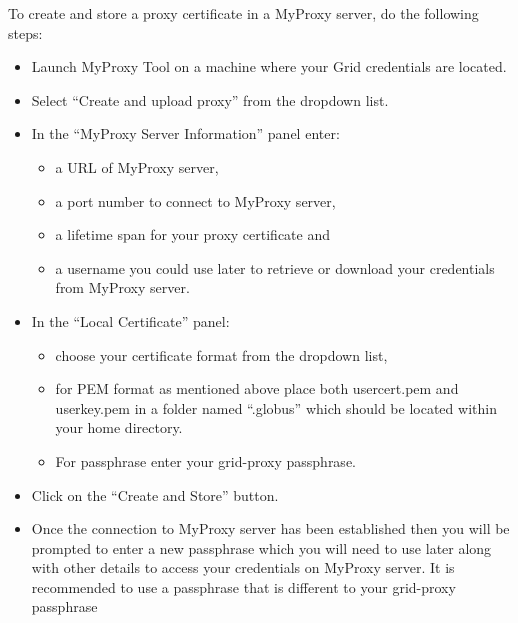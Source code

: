 \documentclass[english]{book}
\begin{document}
To create and store a proxy certificate in a MyProxy server, do the
following steps:
\begin{itemize}
\item {} 
Launch MyProxy Tool on a machine where your Grid credentials are
located.

\item {} 
Select “Create and upload proxy” from the dropdown list.

\item {} 
In the “MyProxy Server Information” panel enter:
\begin{itemize}
\item {} 
a URL of MyProxy server,

\item {} 
a port number to connect to MyProxy server,

\item {} 
a lifetime span for your proxy certificate and

\item {} 
a username you could use later to retrieve or download your
credentials from MyProxy server.

\end{itemize}

\item {} 
In the “Local Certificate” panel:
\begin{itemize}
\item {} 
choose your certificate format from the dropdown list,

\item {} 
for PEM format as mentioned above place both usercert.pem and
userkey.pem in a folder named “.globus” which should be located
within your home directory.

\item {} 
For passphrase enter your grid-proxy passphrase.

\end{itemize}

\item {} 
Click on the “Create and Store” button.

\item {} 
Once the connection to MyProxy server has been established then you
will be prompted to enter a new passphrase which you will need to use
later along with other details to access your credentials on MyProxy
server. It is recommended to use a passphrase that is different to
your grid-proxy passphrase

\end{itemize}
\end{document}
